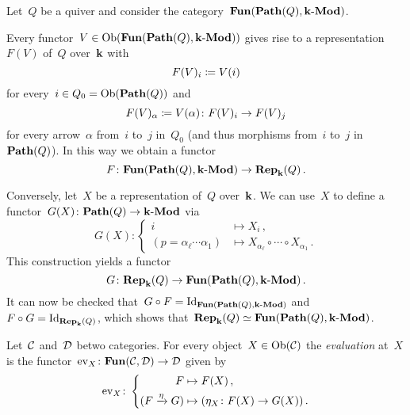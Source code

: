 \begin{example}
  Let~$Q$ be a quiver and consider the category~$\mathbf{Fun}(\mathbf{Path}(Q),\text{$\mathbf{k}$-$\mathbf{Mod}$})$.
  
  Every functor~$V \in \operatorname{Ob}(\mathbf{Fun}(\mathbf{Path}(Q),\text{$\mathbf{k}$-$\mathbf{Mod}$}))$ gives rise to a representation~$F(V)$ of~$Q$ over~$\mathbf{k}$ with
  \[
              F(V)_i
    \coloneqq  V(i)
  \]
  for every~$i \in Q_0 = \operatorname{Ob}(\mathbf{Path}(Q))$ and
  \[
              F(V)_\alpha
    \coloneqq  V(\alpha)
    \colon    F(V)_i
    \to       F(V)_j
  \]
  for every arrow~$\alpha$ from~$i$ to~$j$ in~$Q_0$ (and thus morphisms from~$i$ to~$j$ in~$\mathbf{Path}(Q)$).
  In this way we obtain a functor
  \[
            F
    \colon  \mathbf{Fun}(\mathbf{Path}(Q), \text{$\mathbf{k}$-$\mathbf{Mod}$})
    \to     \mathbf{Rep}_{\mathbf{k}}(Q)  \,.
  \]
  
  Conversely, let~$X$ be a representation of~$Q$ over~$\mathbf{k}$.
  We can use~$X$ to define a functor~$G(X) \colon \mathbf{Path}(Q) \to \text{$\mathbf{k}$-$\mathbf{Mod}$}$ via
  \[
            G(X)
    \colon  \left\{
              \begin{aligned}
                          i
                &\mapsto  X_i \,, \\
                          (p = \alpha_\ell \dotsm \alpha_1)
                &\mapsto  X_{\alpha_\ell} \circ \dotsb \circ X_{\alpha_1} \,.
              \end{aligned}
            \right.
  \]
  This construction yields a functor
  \[
            G
    \colon  \mathbf{Rep}_{\mathbf{k}}(Q)
    \to     \mathbf{Fun}(\mathbf{Path}(Q), \text{$\mathbf{k}$-$\mathbf{Mod}$}) \,.
  \]
  It can now be checked that~$G \circ F = \mathrm{Id}_{\mathbf{Fun}(\mathbf{Path}(Q), \text{$\mathbf{k}$-$\mathbf{Mod}$})}$ and~$F \circ G = \mathrm{Id}_{\mathbf{Rep}_{\mathbf{k}}(Q)}$, which shows that~$\mathbf{Rep}_{\mathbf{k}}(Q) \simeq \mathbf{Fun}(\mathbf{Path}(Q), \text{$\mathbf{k}$-$\mathbf{Mod}$})$.
\end{example}


\begin{definition}
  Let~$\mathcal{C}$ and~$\mathcal{D}$ betwo categories.
  For every object~$X \in \operatorname{Ob}(\mathcal{C})$ the \emph{evaluation} at~$X$ is the functor~$\mathrm{ev}_X \colon \mathbf{Fun}(\mathcal{C}, \mathcal{D}) \to \mathcal{D}$ given by
  \[
            \mathrm{ev}_X
    \colon  \left\{
              \begin{aligned}
                          F
                &\mapsto  F(X) \,,
                \\
                          (F \xrightarrow{\eta} G)
                &\mapsto  (\eta_X \colon F(X) \to G(X)) \,.
              \end{aligned}
            \right.
  \]
\end{definition}


